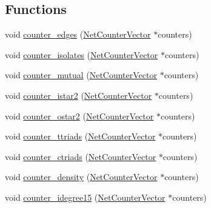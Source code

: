 \subsection*{Functions}
\begin{DoxyCompactItemize}
\item 
void \hyperlink{namespacebarry_1_1counters_1_1network_a3c0a9e6c5697b3ec65827d405826bb33}{counter\+\_\+edges} (\hyperlink{namespacebarry_1_1counters_1_1network_a3b3c590303d47840d1967372ae495d95}{Net\+Counter\+Vector} $\ast$counters)
\item 
void \hyperlink{namespacebarry_1_1counters_1_1network_a16449353394312feed59aa5444d17dad}{counter\+\_\+isolates} (\hyperlink{namespacebarry_1_1counters_1_1network_a3b3c590303d47840d1967372ae495d95}{Net\+Counter\+Vector} $\ast$counters)
\item 
void \hyperlink{namespacebarry_1_1counters_1_1network_afc4086d5788c8d5fa60ec529d9fa15dd}{counter\+\_\+mutual} (\hyperlink{namespacebarry_1_1counters_1_1network_a3b3c590303d47840d1967372ae495d95}{Net\+Counter\+Vector} $\ast$counters)
\item 
void \hyperlink{namespacebarry_1_1counters_1_1network_a95eea8464d85c595efa305cdf9a5a82b}{counter\+\_\+istar2} (\hyperlink{namespacebarry_1_1counters_1_1network_a3b3c590303d47840d1967372ae495d95}{Net\+Counter\+Vector} $\ast$counters)
\item 
void \hyperlink{namespacebarry_1_1counters_1_1network_af76d9df31e55422bdffdb9e56870a46f}{counter\+\_\+ostar2} (\hyperlink{namespacebarry_1_1counters_1_1network_a3b3c590303d47840d1967372ae495d95}{Net\+Counter\+Vector} $\ast$counters)
\item 
void \hyperlink{namespacebarry_1_1counters_1_1network_ab3a9cd11d47c9c1d5652c28d139047c8}{counter\+\_\+ttriads} (\hyperlink{namespacebarry_1_1counters_1_1network_a3b3c590303d47840d1967372ae495d95}{Net\+Counter\+Vector} $\ast$counters)
\item 
void \hyperlink{namespacebarry_1_1counters_1_1network_a5262c1e8a14c9956041adead348a4890}{counter\+\_\+ctriads} (\hyperlink{namespacebarry_1_1counters_1_1network_a3b3c590303d47840d1967372ae495d95}{Net\+Counter\+Vector} $\ast$counters)
\item 
void \hyperlink{namespacebarry_1_1counters_1_1network_a313ba439c81c589759cbbc613d12e80b}{counter\+\_\+density} (\hyperlink{namespacebarry_1_1counters_1_1network_a3b3c590303d47840d1967372ae495d95}{Net\+Counter\+Vector} $\ast$counters)
\item 
void \hyperlink{namespacebarry_1_1counters_1_1network_a148e6fbb549eea53ff6d744b0f683ed6}{counter\+\_\+idegree15} (\hyperlink{namespacebarry_1_1counters_1_1network_a3b3c590303d47840d1967372ae495d95}{Net\+Counter\+Vector} $\ast$counters)

\end{DoxyCompactItemize}

